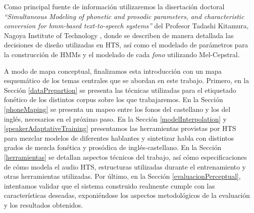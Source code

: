Como principal fuente de información utilizaremos la disertación doctoral \textit{``Simultaneous Modeling of phonetic and prosodic parameters, and characteristic conversion for hmm-based text-to-speech systems''} del Profesor Tadashi Kitamura, Nagoya Institute of Technology \cite{phoneticAndProsodic}, donde se describen de manera detallada las decisiones de diseño utilizadas en HTS, así como el modelado de parámetros para la construcción de HMMs y el modelado de cada \textit{fono} utilizando Mel-Cepstral.

A modo de mapa conceptual, finalizamos esta introducción con un mapa esquemático de los temas centrales que se abordan en este trabajo. Primero, en la Sección \ref{dataPrepartion} se presenta las técnicas utilizadas para el etiquetado fonético de los distintos corpus sobre los que trabajaremos. En la Sección \ref{phoneMaping} se presenta un mapeo entre los fonos del castellano y los del inglés, necesarios en el próximo paso. En la Sección \ref{modelInterpolation} y \ref{speakerAdaptativeTraining} presentamos las herramientas provistas por HTS para mezclar modelos de diferentes hablantes y sintetizar habla con distintos grados de mezcla fonética y prosódica de inglés-castellano. En la Sección \ref{herramientas} se detallan aspectos técnicos del trabajo, así cómo especificaciones de cómo modela el audio HTS, estructuras utilizadas durante el entrenamiento y otras herramientas utilizadas. Por último, en la Sección \ref{evaluacionPerceptual}, intentamos validar que el sistema construido realmente cumple con las características deseadas, exponiéndose los aspectos metodológicos de la evaluación y los resultados obtenidos.
